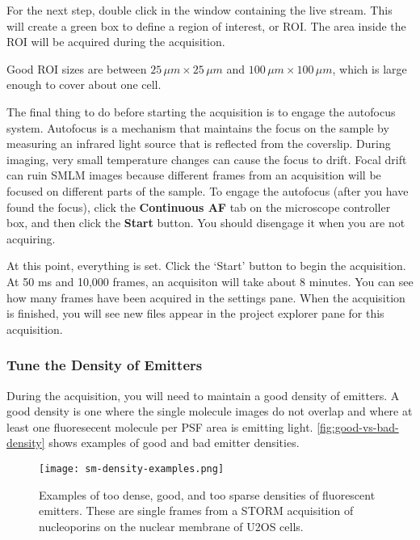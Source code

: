 \documentclass[10pt,a4paper,oneside]{book}
\begin{document}
For the next step, double click in the window containing the live stream. This will create a green box to define a region of interest, or ROI. The area inside the ROI will be acquired during the acquisition.

\newline

Good ROI sizes are between $25 \, \mu m\times 25 \, \mu m$ and $100 \, \mu m\times 100 \, \mu m$, which is large enough to cover about one cell.

The final thing to do before starting the acquisition is to engage the autofocus system. Autofocus is a mechanism that maintains the focus on the sample by measuring an infrared light source that is reflected from the coverslip. During imaging, very small temperature changes can cause the focus to drift. Focal drift can ruin SMLM images because different frames from an acquisition will be focused on different parts of the sample. To engage the autofocus (after you have found the focus), click the \textbf{Continuous AF} tab on the microscope controller box, and then click the \textbf{Start} button. You should disengage it when you are not acquiring.

At this point, everything is set. Click the `Start' button to begin the acquisition. At 50 ms and 10,000 frames, an acquisiton will take about 8 minutes. You can see how many frames have been acquired in the settings pane. When the acquisition is finished, you will see new files appear in the project explorer pane for this acquisition.

\subsubsection{Tune the Density of Emitters}

During the acquisition, you will need to maintain a good density of emitters. A good density is one where the single molecule images do not overlap and where at least one fluoresecent molecule per PSF area is emitting light. \autoref{fig:good-vs-bad-density} shows examples of good and bad emitter densities.

\begin{figure}[ht]
    \centering
    \texttt{[image: sm-density-examples.png]}
    \caption{Examples of too dense, good, and too sparse densities of fluorescent emitters. These are single frames from a STORM acquisition of nucleoporins on the nuclear membrane of U2OS cells.}
    \label{fig:good-vs-bad-density}
\end{figure}
\end{document}
